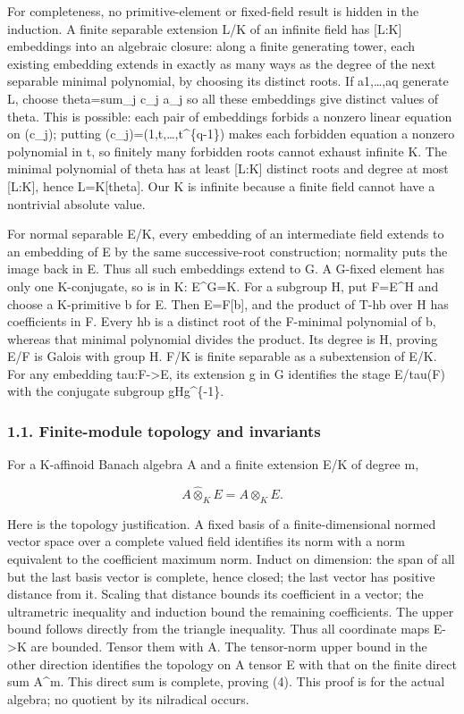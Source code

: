 \documentclass[
  10pt,
]{article}
\begin{document}
For completeness, no primitive-element or fixed-field result is hidden
in the induction. A finite separable extension L/K of an infinite field
has {[}L:K{]} embeddings into an algebraic closure: along a finite
generating tower, each existing embedding extends in exactly as many
ways as the degree of the next separable minimal polynomial, by choosing
its distinct roots. If a1,\ldots,aq generate L, choose theta=sum\_j c\_j
a\_j so all these embeddings give distinct values of theta. This is
possible: each pair of embeddings forbids a nonzero linear equation on
(c\_j); putting (c\_j)=(1,t,\ldots,t\^{}\{q-1\}) makes each forbidden
equation a nonzero polynomial in t, so finitely many forbidden roots
cannot exhaust infinite K. The minimal polynomial of theta has at least
{[}L:K{]} distinct roots and degree at most {[}L:K{]}, hence
L=K{[}theta{]}. Our K is infinite because a finite field cannot have a
nontrivial absolute value.

For normal separable E/K, every embedding of an intermediate field
extends to an embedding of E by the same successive-root construction;
normality puts the image back in E. Thus all such embeddings extend to
G. A G-fixed element has only one K-conjugate, so is in K: E\^{}G=K. For
a subgroup H, put F=E\^{}H and choose a K-primitive b for E. Then
E=F{[}b{]}, and the product of T-hb over H has coefficients in F. Every
hb is a distinct root of the F-minimal polynomial of b, whereas that
minimal polynomial divides the product. Its degree is
\textbar H\textbar, proving E/F is Galois with group H. F/K is finite
separable as a subextension of E/K. For any embedding
tau:F-\textgreater E, its extension g in G identifies the stage E/tau(F)
with the conjugate subgroup gHg\^{}\{-1\}.

\subsubsection{1.1. Finite-module topology and
invariants}\label{finite-module-topology-and-invariants}

For a K-affinoid Banach algebra A and a finite extension E/K of degree
m,

\[
 A\widehat\otimes_K E=A\otimes_K E.                          \tag{4}
\]

Here is the topology justification. A fixed basis of a
finite-dimensional normed vector space over a complete valued field
identifies its norm with a norm equivalent to the coefficient maximum
norm. Induct on dimension: the span of all but the last basis vector is
complete, hence closed; the last vector has positive distance from it.
Scaling that distance bounds its coefficient in a vector; the
ultrametric inequality and induction bound the remaining coefficients.
The upper bound follows directly from the triangle inequality. Thus all
coordinate maps E-\textgreater K are bounded. Tensor them with A. The
tensor-norm upper bound in the other direction identifies the topology
on A tensor E with that on the finite direct sum A\^{}m. This direct sum
is complete, proving (4). This proof is for the actual algebra; no
quotient by its nilradical occurs.
\end{document}
